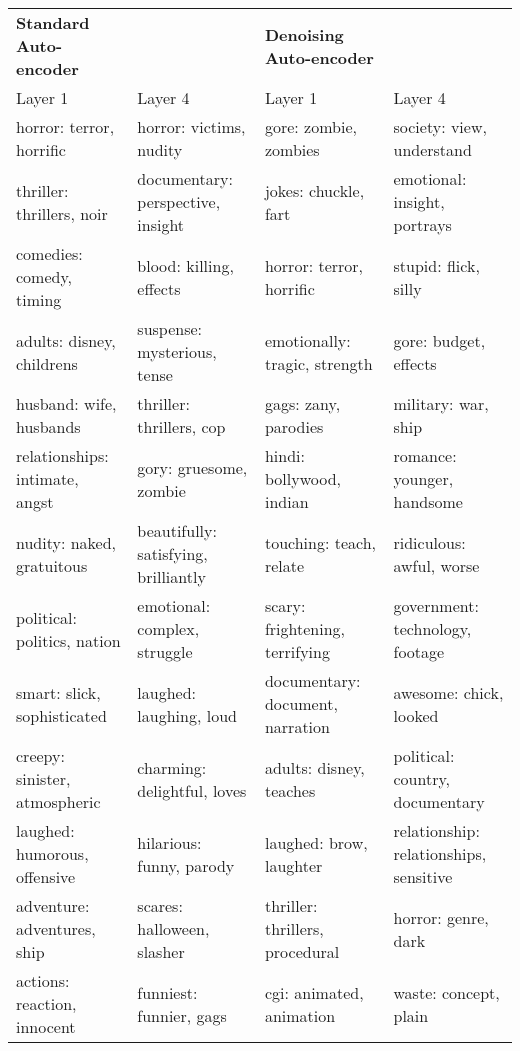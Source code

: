 \begin{sidewaystable}
	\vspace{5 mm}
	
	\setlength\extrarowheight{-3pt}
	
	\begin{tabular}{llll}
		
		\bf Standard Auto-encoder &   & \textbf{Denoising Auto-encoder} &   \\
		Layer 1     &  Layer 4  &  Layer 1   &  Layer 4 \\
		\toprule
		horror: terror, horrific & horror: victims, nudity  & gore: zombie, zombies & society: view, understand \\
		thriller: thrillers, noir & documentary: perspective, insight  & jokes: chuckle, fart & emotional: insight, portrays \\
		comedies: comedy, timing & blood: killing, effects   & horror: terror, horrific & stupid: flick, silly  \\
		adults: disney, childrens & suspense: mysterious, tense & emotionally: tragic, strength &  gore: budget, effects  \\
		husband: wife, husbands &  thriller: thrillers, cop  & gags: zany, parodies & military: war, ship \\
		relationships: intimate, angst & gory: gruesome, zombie  & hindi: bollywood, indian & romance: younger, handsome \\
		nudity: naked, gratuitous & beautifully: satisfying, brilliantly & touching: teach, relate & ridiculous: awful, worse   \\
		political: politics, nation & emotional: complex, struggle & scary: frightening, terrifying & government: technology, footage  \\
		smart: slick, sophisticated &  laughed: laughing, loud & documentary: document, narration & awesome: chick, looked\\
		creepy: sinister, atmospheric & charming: delightful, loves & adults: disney, teaches &  political: country, documentary\\
		laughed: humorous, offensive & hilarious: funny, parody & laughed: brow, laughter & relationship: relationships, sensitive \\
		adventure: adventures, ship & scares: halloween, slasher & thriller: thrillers, procedural & horror: genre, dark  \\
		actions: reaction, innocent & funniest: funnier, gags & cgi: animated, animation &  waste: concept, plain   \\

\end{tabular}
\end{sidewaystable}
